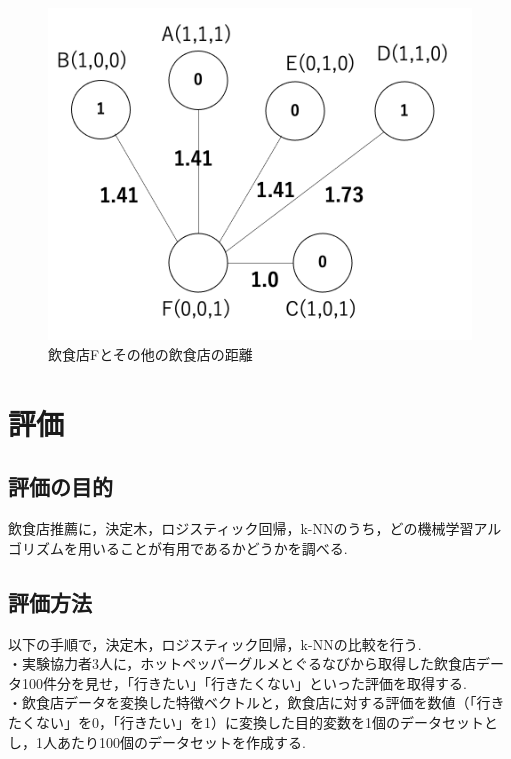 \documentclass[12pt,a4j]{jreport}
\begin{document}
\vspace{5mm}

\begin{figure}[htbp]
  \begin{center}
    \includegraphics[width=12cm]{image/fig3.png}
    \caption{飲食店Fとその他の飲食店の距離}
    \label{fig3}
  \end{center}
\end{figure}


\chapter{評価}
\section{評価の目的}
飲食店推薦に，決定木，ロジスティック回帰，k-NNのうち，どの機械学習アルゴリズムを用いることが有用であるかどうかを調べる.

\section{評価方法}
以下の手順で，決定木，ロジスティック回帰，k-NNの比較を行う.\\

・実験協力者3人に，ホットペッパーグルメとぐるなびから取得した飲食店データ100件分を見せ，「行きたい」「行きたくない」といった評価を取得する.\\

・飲食店データを変換した特徴ベクトルと，飲食店に対する評価を数値（「行きたくない」を0，「行きたい」を1）に変換した目的変数を1個のデータセットとし，1人あたり100個のデータセットを作成する.\\
\end{document}

